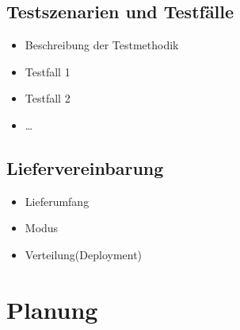 \subsection{Testszenarien und Testfälle}
\begin{itemize}
	\item Beschreibung der Testmethodik
	\item Testfall 1
	\item Testfall 2
	\item \ldots
\end{itemize}
\subsection{Liefervereinbarung}
\begin{itemize}
	\item Lieferumfang
	\item Modus
	\item Verteilung(Deployment)
\end{itemize}


\section{Planung}
